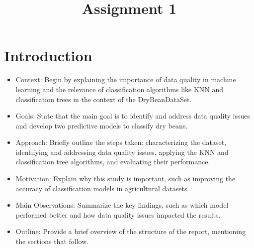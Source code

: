 \documentclass[10pt, conference]{IEEEtran}
\begin{document}
\title{Assignment 1\\
}

\author{
}

\maketitle

\begin{abstract}
    
\end{abstract}

\section{Introduction}

\begin{itemize}
    \item Context: Begin by explaining the importance of data quality in machine learning and the relevance of classification algorithms like KNN and classification trees in the context of the DryBeanDataSet.
    \item Goals: State that the main goal is to identify and address data quality issues and develop two predictive models to classify dry beans.
    \item Approach: Briefly outline the steps taken: characterizing the dataset, identifying and addressing data quality issues, applying the KNN and classification tree algorithms, and evaluating their performance.
    \item Motivation: Explain why this study is important, such as improving the accuracy of classification models in agricultural datasets.
    \item Main Observations: Summarize the key findings, such as which model performed better and how data quality issues impacted the results.
    \item Outline: Provide a brief overview of the structure of the report, mentioning the sections that follow.
\end{itemize}
\end{document}
